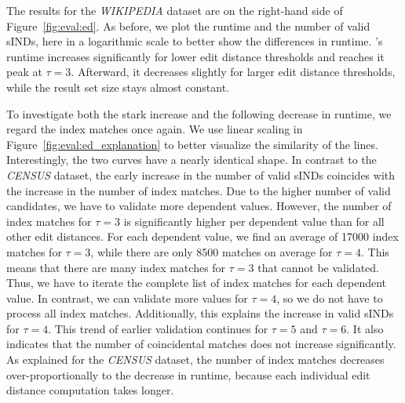 The results for the \emph{WIKIPEDIA} dataset are on the right-hand side of Figure~\ref{fig:eval:ed}.
As before, we plot the runtime and the number of valid sINDs, here in a logarithmic scale to better show the differences in runtime.
\sawfish's runtime increases significantly for lower edit distance thresholds and reaches it peak at $\tau = 3$.
Afterward, it decreases slightly for larger edit distance thresholds, while the result set size stays almost constant.

To investigate both the stark increase and the following decrease in runtime, we regard the index matches once again.
We use linear scaling in Figure~\ref{fig:eval:ed_explanation} to better visualize the similarity of the lines.
Interestingly, the two curves have a nearly identical shape.
In contrast to the \emph{CENSUS} dataset, the early increase in the number of valid sINDs coincides with the increase in the number of index matches.
Due to the higher number of valid candidates, we have to validate more dependent values.
However, the number of index matches for $\tau = 3$ is significantly higher per dependent value than for all other edit distances.
For each dependent value, we find an average of \num{17000} index matches for $\tau = 3$, while there are only \num{8500} matches on average for $\tau = 4$.
This means that there are many index matches for $\tau = 3$ that cannot be validated.
Thus, we have to iterate the complete list of index matches for each dependent value.
In contrast, we can validate more values for $\tau = 4$, so we do not have to process all index matches.
Additionally, this explains the increase in valid sINDs for $\tau = 4$.
This trend of earlier validation continues for $\tau = 5$ and $\tau = 6$.
It also indicates that the number of coincidental matches does not increase significantly.
As explained for the \emph{CENSUS} dataset, the number of index matches decreases over-proportionally to the decrease in runtime, because each individual edit distance computation takes longer.

